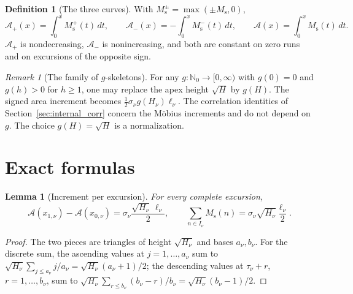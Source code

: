 \documentclass[11pt]{amsart}
\numberwithin{equation}{section}
\theoremstyle{plain}
\newtheorem{lemma}[theorem]{Lemma}
\theoremstyle{definition}
\newtheorem{definition}[theorem]{Definition}
\theoremstyle{remark}
\newtheorem{remark}[theorem]{Remark}
\newcommand{\Ms}{M_{\mathrm{s}}}
\newcommand{\Ap}{\mathcal{A}_{+}}
\newcommand{\Am}{\mathcal{A}_{-}}
\newcommand{\Anet}{\mathcal{A}}
\begin{document}
\begin{definition}[The three curves]
\label{def:areas}
With $\Ms^{\pm}=\max(\pm\Ms,0)$,
\begin{equation}
\label{eq:areas_def}
\Ap(x)=\int_0^x\Ms^+(t)\,dt,\qquad
\Am(x)=-\int_0^x\Ms^-(t)\,dt,\qquad
\Anet(x)=\int_0^x\Ms(t)\,dt.
\end{equation}
$\Ap$ is nondecreasing, $\Am$ is nonincreasing, and both are constant on
zero runs and on excursions of the opposite sign.
\end{definition}

\begin{remark}[The family of $g$-skeletons]
\label{rem:g-skeleton}
For any $g:\mathbb N_0\to[0,\infty)$ with $g(0)=0$ and $g(h)>0$ for $h\ge1$,
one may replace the apex height $\sqrt H$ by $g(H)$. The signed area
increment becomes $\tfrac12\sigma_\nu g(H_\nu)\ell_\nu$. The correlation
identities of Section~\ref{sec:internal_corr} concern the M\"obius
increments and do not depend on $g$. The choice $g(H)=\sqrt H$ is a
normalization.
\end{remark}

\section{Exact formulas}
\label{sec:formulas}

\begin{lemma}[Increment per excursion]
\label{lem:jump}
For every complete excursion,
\begin{equation}
\label{eq:jump}
\Anet(x_{1,\nu})-\Anet(x_{0,\nu})
=\sigma_\nu\frac{\sqrt{H_\nu}\,\ell_\nu}{2},
\qquad
\sum_{n\in I_\nu}\Ms(n)
=\sigma_\nu\sqrt{H_\nu}\frac{\ell_\nu}{2}.
\end{equation}
\end{lemma}

\begin{proof}
The two pieces are triangles of height $\sqrt{H_\nu}$ and bases $a_\nu,b_\nu$.
For the discrete sum, the ascending values at $j=1,\ldots,a_\nu$ sum to
$\sqrt{H_\nu}\sum_{j\le a_\nu}j/a_\nu=\sqrt{H_\nu}(a_\nu+1)/2$; the
descending values at $\tau_\nu+r$, $r=1,\ldots,b_\nu$, sum to
$\sqrt{H_\nu}\sum_{r\le b_\nu}(b_\nu-r)/b_\nu=\sqrt{H_\nu}(b_\nu-1)/2$.
\end{proof}
\end{document}
